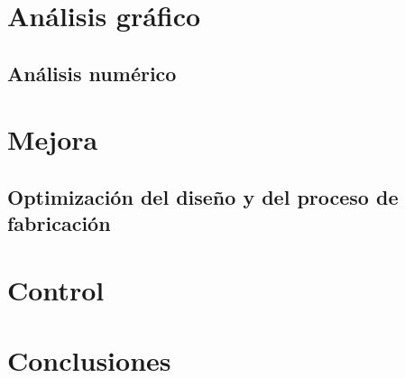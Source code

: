 \documentclass[12pt,a4paper,twoside,openright,titlepage,final]{article}
\begin{document}
\section{Análisis gráfico}

\subsection{Análisis numérico}

\section{Mejora}

\subsection{Optimización del diseño y del proceso de fabricación}

\section{Control}

\section{Conclusiones}
\end{document}
